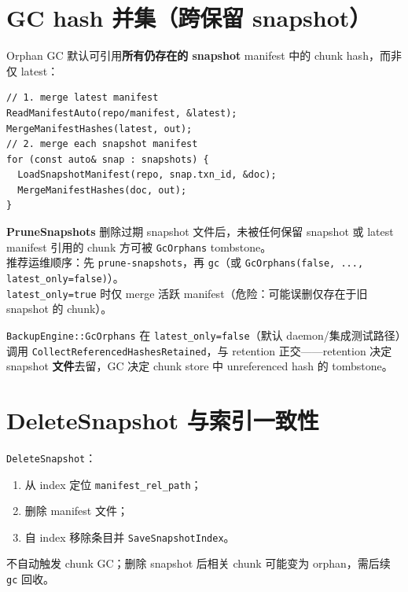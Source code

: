 \section{GC hash 并集（跨保留 snapshot）}

Orphan GC 默认可引用\textbf{所有仍存在的 snapshot} manifest 中的 chunk hash，而非仅 latest：

\begin{lstlisting}[caption={CollectReferencedHashesRetained（节选）},label={lst:gc-retained}]
// 1. merge latest manifest
ReadManifestAuto(repo/manifest, &latest);
MergeManifestHashes(latest, out);
// 2. merge each snapshot manifest
for (const auto& snap : snapshots) {
  LoadSnapshotManifest(repo, snap.txn_id, &doc);
  MergeManifestHashes(doc, out);
}
\end{lstlisting}

\begin{invariantbox}[I-GC1：Prune 与 GC 顺序]
\textbf{PruneSnapshots} 删除过期 snapshot 文件后，未被任何保留 snapshot 或 latest manifest 引用的 chunk 方可被 \texttt{GcOrphans} tombstone。\\
推荐运维顺序：先 \texttt{prune-snapshots}，再 \texttt{gc}（或 \texttt{GcOrphans(false, ..., latest\_only=false)}）。\\
\texttt{latest\_only=true} 时仅 merge 活跃 manifest（危险：可能误删仅存在于旧 snapshot 的 chunk）。
\end{invariantbox}

\texttt{BackupEngine::GcOrphans} 在 \texttt{latest\_only=false}（默认 daemon/集成测试路径）调用 \texttt{CollectReferencedHashesRetained}，与 retention 正交——retention 决定 snapshot \textbf{文件}去留，GC 决定 chunk store 中 unreferenced hash 的 tombstone。

\section{DeleteSnapshot 与索引一致性}

\texttt{DeleteSnapshot}：
\begin{enumerate}[nosep]
  \item 从 index 定位 \texttt{manifest\_rel\_path}；
  \item 删除 manifest 文件；
  \item 自 index 移除条目并 \texttt{SaveSnapshotIndex}。
\end{enumerate}

不自动触发 chunk GC；删除 snapshot 后相关 chunk 可能变为 orphan，需后续 \texttt{gc} 回收。


